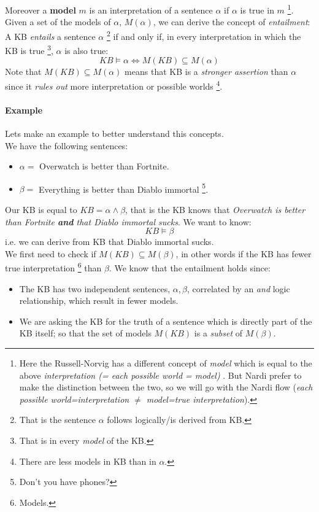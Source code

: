 \documentclass[10pt,a4paper]{article}
\begin{document}
Moreover a \textbf{model} $m$ is an interpretation of a sentence $\alpha$ if $\alpha$ is true in $m$ \footnote{Here the Russell-Norvig has a different concept of \textit{model} which is equal to the above \textit{interpretation (= each possible world = model)} . But Nardi prefer to make the distinction between the two, so we will go with the Nardi flow (\textit{each possible world=interpretation $\neq$ model=true interpretation}).}. Given a set of the models of $\alpha$, $M(\alpha)$, we can derive the concept of \textit{entailment}:\\
A KB \textit{entails} a sentence $\alpha$ \footnote{That is the sentence $\alpha$ follows logically/is derived from KB.} if and only if, in every interpretation in which the KB is true \footnote{That is in every \textit{model} of the KB.}, $\alpha$ is also true:
\[KB \models \alpha \Leftrightarrow M(KB) \subseteq M(\alpha)\]
Note that $ M(KB) \subseteq M(\alpha)$ means that KB is a \textit{stronger assertion} than $\alpha$ since it \textit{rules out} more interpretation or possible worlds \footnote{There are less models in KB than in $\alpha$.}.

\paragraph{Example} Lets make an example to better understand this concepts.\\
We have the following sentences: 
\begin{itemize}
\item $\alpha=$ Overwatch is better than Fortnite.
\item $\beta=$ Everything is better than Diablo immortal \footnote{Don't you have phones?}.
\end{itemize}
Our KB is equal to $KB=\alpha \wedge \beta$, that is the KB knows that \textit{Overwatch is better than Fortnite \textbf{and} that Diablo immortal sucks}. We want to know:
\[KB \models \beta\]
i.e. we can derive from KB that Diablo immortal sucks.\\
We first need to check if $M(KB) \subseteq M(\beta)$, in other words if the KB has fewer true interpretation \footnote{Models.} than $\beta$. We know that the entailment holds since:
\begin{itemize}
\item The KB has two independent sentences, $\alpha,\beta$, correlated by an \textit{and} logic relationship, which result in fewer models.
\item  We are asking the KB for the truth of a sentence which is directly part of the KB itself; so that the set of models $M(KB)$ is a \textit{subset} of $M(\beta)$.
\end{itemize}
\end{document}
